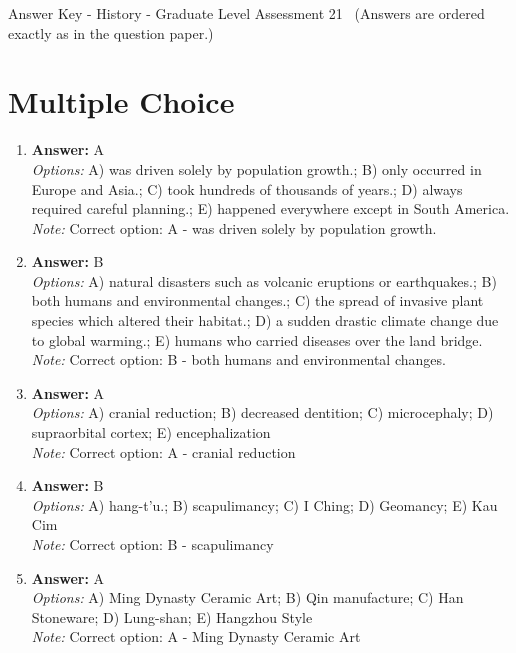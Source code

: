 \documentclass[12pt]{article}
\begin{document}
\begin{center}
Answer Key - History - Graduate Level Assessment 21 \
\small (Answers are ordered exactly as in the question paper.)
\end{center}

\section*{Multiple Choice}
\begin{enumerate}[label=\arabic*.]
\item \textbf{Answer:} A
\\ \textit{Options:} A) was driven solely by population growth.; B) only occurred in Europe and Asia.; C) took hundreds of thousands of years.; D) always required careful planning.; E) happened everywhere except in South America.
\\ \textit{Note:} Correct option: A - was driven solely by population growth.
\item \textbf{Answer:} B
\\ \textit{Options:} A) natural disasters such as volcanic eruptions or earthquakes.; B) both humans and environmental changes.; C) the spread of invasive plant species which altered their habitat.; D) a sudden drastic climate change due to global warming.; E) humans who carried diseases over the land bridge.
\\ \textit{Note:} Correct option: B - both humans and environmental changes.
\item \textbf{Answer:} A
\\ \textit{Options:} A) cranial reduction; B) decreased dentition; C) microcephaly; D) supraorbital cortex; E) encephalization
\\ \textit{Note:} Correct option: A - cranial reduction
\item \textbf{Answer:} B
\\ \textit{Options:} A) hang-t'u.; B) scapulimancy; C) I Ching; D) Geomancy; E) Kau Cim
\\ \textit{Note:} Correct option: B - scapulimancy
\item \textbf{Answer:} A
\\ \textit{Options:} A) Ming Dynasty Ceramic Art; B) Qin manufacture; C) Han Stoneware; D) Lung-shan; E) Hangzhou Style
\\ \textit{Note:} Correct option: A - Ming Dynasty Ceramic Art
\end{enumerate}
\end{document}
